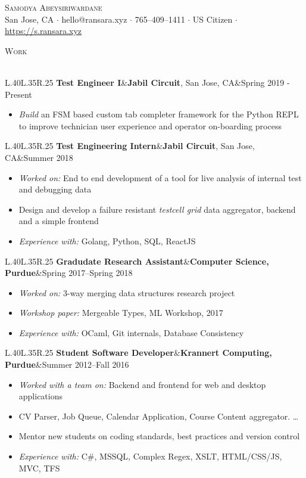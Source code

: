 \documentclass[a4paper]{article}
\newcommand{\header} [1] {
    {\hspace*{-18pt}\vspace*{6pt} \textsc{#1}
    \vspace*{-14pt} \\ \hspace*{-18pt} \hrulefill{} \\
    \vspace{1mm}}
}
\newcommand{\threeparts} [3] {
    {\setlength\tabcolsep{0pt}
    \begin{tabularx}{\linewidth}{L{.40\linewidth}L{.35\linewidth}R{.25\linewidth}} 
    \textbf{#1}&#2&#3
    \end{tabularx}}
}
\begin{document}
\begin{center}
	{\Huge \scshape {Samodya Abeysiriwardane}}\\
	San Jose, CA $\cdot$ hello@ransara.xyz $\cdot$ 765--409--1411 $\cdot$ US Citizen $\cdot$ \url{https://s.ransara.xyz}\\
\end{center}

\header{Work}
\threeparts{Test Engineer I}{\textbf{Jabil Circuit}, San Jose, CA}{Spring 2019 - Present}
\begin{itemize}[label=$\square$]
	\item \textit{Build} an FSM based custom tab completer framework for the Python REPL to improve technician user experience and operator on-boarding process
\end{itemize}
\threeparts{Test Engineering Intern}{\textbf{Jabil Circuit}, San Jose, CA}{Summer 2018}
\begin{itemize}[label=$\square$]
	\item \textit{Worked on:} End to end development of a tool for live analysis of internal test and debugging data
    \item Design and develop a failure resistant \textit{testcell grid} data aggregator, backend and a simple frontend
    \item \textit{Experience with:} Golang, Python, SQL, ReactJS
\end{itemize}
\threeparts{Gradudate Research Assistant}{\textbf{Computer Science, Purdue}}{Spring 2017--Spring 2018}
\begin{itemize}[label=$\square$]
    \item \textit{Worked on:} 3-way merging data structures research project
    \item \textit{Workshop paper:} Mergeable Types, ML Workshop, 2017
	\item \textit{Experience with:} OCaml, Git internals, Database Consistency
\end{itemize}
\threeparts{Student Software Developer}{\textbf{Krannert Computing, Purdue}}{Summer 2012--Fall 2016}
\begin{itemize}[label=$\square$]
    \item \textit{Worked with a team on:} Backend and frontend for web and desktop applications
    \item CV Parser, Job Queue, Calendar Application, Course Content aggregator. \dots
    \item Mentor new students on coding standards, best practices and version control
    \item \textit{Experience with:} C\#, MSSQL, Complex Regex, XSLT, HTML/CSS/JS, MVC, TFS
\end{itemize}
\end{document}

